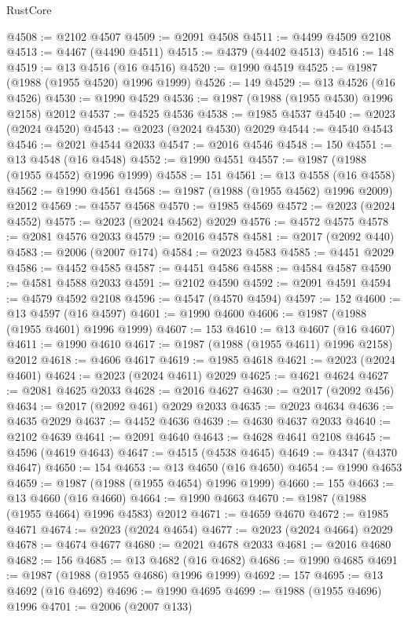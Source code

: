 \begin{lexlean}{RustCore}
\begin{coremodule}
@4508 := @2102 @4507
@4509 := @2091 @4508
@4511 := @4499 @4509 @2108
@4513 := @4467 (@4490 @4511)
@4515 := @4379 (@4402 @4513)
@4516 := 148
@4519 := @13 @4516 (@16 @4516)
@4520 := @1990 @4519
@4525 := @1987 (@1988 (@1955 @4520) @1996 @1999)
@4526 := 149
@4529 := @13 @4526 (@16 @4526)
@4530 := @1990 @4529
@4536 := @1987 (@1988 (@1955 @4530) @1996 @2158) @2012
@4537 := @4525 @4536
@4538 := @1985 @4537
@4540 := @2023 (@2024 @4520)
@4543 := @2023 (@2024 @4530) @2029
@4544 := @4540 @4543
@4546 := @2021 @4544 @2033
@4547 := @2016 @4546
@4548 := 150
@4551 := @13 @4548 (@16 @4548)
@4552 := @1990 @4551
@4557 := @1987 (@1988 (@1955 @4552) @1996 @1999)
@4558 := 151
@4561 := @13 @4558 (@16 @4558)
@4562 := @1990 @4561
@4568 := @1987 (@1988 (@1955 @4562) @1996 @2009) @2012
@4569 := @4557 @4568
@4570 := @1985 @4569
@4572 := @2023 (@2024 @4552)
@4575 := @2023 (@2024 @4562) @2029
@4576 := @4572 @4575
@4578 := @2081 @4576 @2033
@4579 := @2016 @4578
@4581 := @2017 (@2092 @440)
@4583 := @2006 (@2007 @174)
@4584 := @2023 @4583
@4585 := @4451 @2029
@4586 := @4452 @4585
@4587 := @4451 @4586
@4588 := @4584 @4587
@4590 := @4581 @4588 @2033
@4591 := @2102 @4590
@4592 := @2091 @4591
@4594 := @4579 @4592 @2108
@4596 := @4547 (@4570 @4594)
@4597 := 152
@4600 := @13 @4597 (@16 @4597)
@4601 := @1990 @4600
@4606 := @1987 (@1988 (@1955 @4601) @1996 @1999)
@4607 := 153
@4610 := @13 @4607 (@16 @4607)
@4611 := @1990 @4610
@4617 := @1987 (@1988 (@1955 @4611) @1996 @2158) @2012
@4618 := @4606 @4617
@4619 := @1985 @4618
@4621 := @2023 (@2024 @4601)
@4624 := @2023 (@2024 @4611) @2029
@4625 := @4621 @4624
@4627 := @2081 @4625 @2033
@4628 := @2016 @4627
@4630 := @2017 (@2092 @456)
@4634 := @2017 (@2092 @461) @2029 @2033
@4635 := @2023 @4634
@4636 := @4635 @2029
@4637 := @4452 @4636
@4639 := @4630 @4637 @2033
@4640 := @2102 @4639
@4641 := @2091 @4640
@4643 := @4628 @4641 @2108
@4645 := @4596 (@4619 @4643)
@4647 := @4515 (@4538 @4645)
@4649 := @4347 (@4370 @4647)
@4650 := 154
@4653 := @13 @4650 (@16 @4650)
@4654 := @1990 @4653
@4659 := @1987 (@1988 (@1955 @4654) @1996 @1999)
@4660 := 155
@4663 := @13 @4660 (@16 @4660)
@4664 := @1990 @4663
@4670 := @1987 (@1988 (@1955 @4664) @1996 @4583) @2012
@4671 := @4659 @4670
@4672 := @1985 @4671
@4674 := @2023 (@2024 @4654)
@4677 := @2023 (@2024 @4664) @2029
@4678 := @4674 @4677
@4680 := @2021 @4678 @2033
@4681 := @2016 @4680
@4682 := 156
@4685 := @13 @4682 (@16 @4682)
@4686 := @1990 @4685
@4691 := @1987 (@1988 (@1955 @4686) @1996 @1999)
@4692 := 157
@4695 := @13 @4692 (@16 @4692)
@4696 := @1990 @4695
@4699 := @1988 (@1955 @4696) @1996
@4701 := @2006 (@2007 @133)

\end{coremodule}
\end{lexlean}
